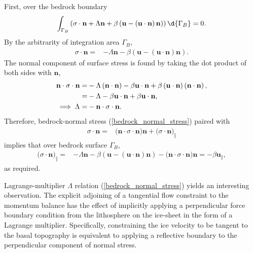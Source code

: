 First, over the bedrock boundary
\begin{align*}
  \int_{\Gamma_B} \left( \sigma \cdot \mathbf{n}
  + \Lambda \mathbf{n} + \beta \left( \mathbf{u} - \left( \mathbf{u} \cdot \mathbf{n} \right) \mathbf{n} \right) \right) \d{\Gamma_B} = 0.
\end{align*}
By the arbitrarity of integration area $\Gamma_B$,
\begin{align}
  \label{bedrock_traction}
  \sigma \cdot \mathbf{n} =
  &- \Lambda \mathbf{n} - \beta \left( \mathbf{u} - \left( \mathbf{u} \cdot \mathbf{n} \right) \mathbf{n} \right).
\end{align}
The normal component of surface stress is found by taking the dot product of both sides with $\mathbf{n}$,
\begin{align}
  \mathbf{n} \cdot \sigma \cdot \mathbf{n}
  =&- \Lambda \left( \mathbf{n} \cdot \mathbf{n} \right) - \beta \mathbf{u} \cdot \mathbf{n} + \beta \left( \mathbf{u} \cdot \mathbf{n} \right) \left( \mathbf{n} \cdot \mathbf{n} \right), \notag \\
  =&- \Lambda - \beta \mathbf{u} \cdot \mathbf{n} + \beta \mathbf{u} \cdot \mathbf{n}, \notag \\
  \label{bedrock_normal_stress}
  \implies \Lambda = &- \mathbf{n} \cdot \sigma \cdot \mathbf{n}.
\end{align}
Therefore, bedrock-normal stress (\ref{bedrock_normal_stress}) paired with
\begin{align*}
  \sigma \cdot \mathbf{n}
  =& \big( \mathbf{n} \cdot \sigma \cdot \mathbf{n} \big) \mathbf{n} + \big( \sigma \cdot \mathbf{n} \big)_{\Vert}
\end{align*}
implies that over bedrock surface $\Gamma_B$,
\begin{align*}
  \big( \sigma \cdot \mathbf{n} \big)_{\Vert} = & - \Lambda \mathbf{n} - \beta \left( \mathbf{u} - \left( \mathbf{u} \cdot \mathbf{n} \right) \mathbf{n} \right) - \big( \mathbf{n} \cdot \sigma \cdot \mathbf{n} \big) \mathbf{n}
  = - \beta \mathbf{u}_{\Vert},
\end{align*}
as required.

Lagrange-multiplier $\Lambda$ relation (\ref{bedrock_normal_stress}) yields an interesting observation.
The explicit adjoining of a tangential flow constraint to the momentum balance has the effect of implicitly applying a perpendicular force boundary condition from the lithosphere on the ice-sheet in the form of a Lagrange multiplier.
Specifically, constraining the ice velocity to be tangent to the basal topography is equivalent to applying a reflective boundary to the perpendicular component of normal stress.

